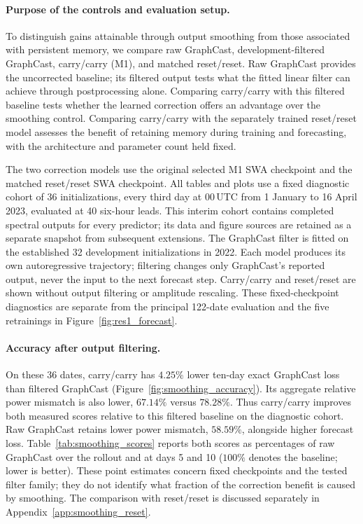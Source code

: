 \documentclass{article}
\newcommand{\vfourred}[1]{{\color{red}#1}}
\begin{document}
\paragraph{\vfourred{Purpose of the controls and evaluation setup.}}
\vfourred{To distinguish gains attainable through output smoothing from those associated with persistent memory, we compare raw GraphCast, development-filtered GraphCast, carry/carry (M1), and matched reset/reset. Raw GraphCast provides the uncorrected baseline; its filtered output tests what the fitted linear filter can achieve through postprocessing alone. Comparing carry/carry with this filtered baseline tests whether the learned correction offers an advantage over the smoothing control. Comparing carry/carry with the separately trained reset/reset model assesses the benefit of retaining memory during training and forecasting, with the architecture and parameter count held fixed.}

\vfourred{The two correction models use the original selected M1 SWA checkpoint and the matched reset/reset SWA checkpoint. All tables and plots use a fixed diagnostic cohort of 36 initializations, every third day at 00\,UTC from 1 January to 16 April 2023, evaluated at 40 six-hour leads. This interim cohort contains completed spectral outputs for every predictor; its data and figure sources are retained as a separate snapshot from subsequent extensions. The GraphCast filter is fitted on the established 32 development initializations in 2022. Each model produces its own autoregressive trajectory; filtering changes only GraphCast's reported output, never the input to the next forecast step. Carry/carry and reset/reset are shown without output filtering or amplitude rescaling. These fixed-checkpoint diagnostics are separate from the principal 122-date evaluation and the five retrainings in Figure~\ref{fig:res1_forecast}.}

\paragraph{\vfourred{Accuracy after output filtering.}}
\vfourred{On these 36 dates, carry/carry has $4.25\%$ lower ten-day exact GraphCast loss than filtered GraphCast (Figure~\ref{fig:smoothing_accuracy}). Its aggregate relative power mismatch is also lower, $67.14\%$ versus $78.28\%$. Thus carry/carry improves both measured scores relative to this filtered baseline on the diagnostic cohort. Raw GraphCast retains lower power mismatch, $58.59\%$, alongside higher forecast loss. Table~\ref{tab:smoothing_scores} reports both scores as percentages of raw GraphCast over the rollout and at days 5 and 10 ($100\%$ denotes the baseline; lower is better). These point estimates concern fixed checkpoints and the tested filter family; they do not identify what fraction of the correction benefit is caused by smoothing. The comparison with reset/reset is discussed separately in Appendix~\ref{app:smoothing_reset}.}
\end{document}
